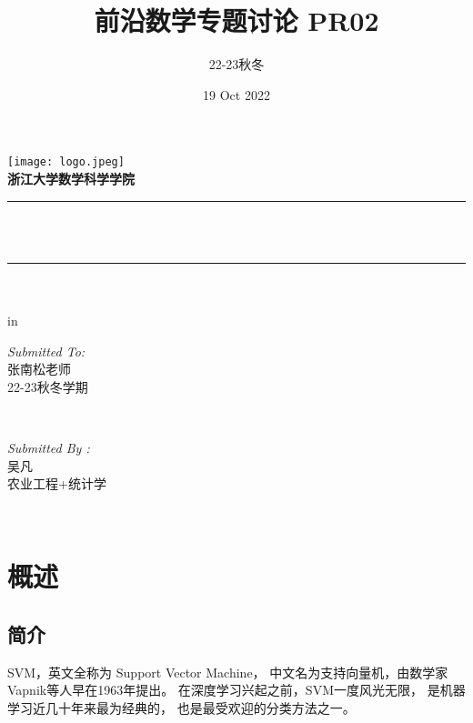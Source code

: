 \documentclass[12pt]{article}
\title{ 前沿数学专题讨论 PR02}								%
\author{22-23秋冬}								%
\date{19 Oct 2022}	%
\makeatletter
\let\thetitle\@title
\let\thedate\@date
\makeatother
\begin{document}

\begin{titlepage}
	\centering
    \vspace*{0.5 cm}
    \texttt{[image: logo.jpeg]}\\[1.0 cm]	%
	\textsc{\Large \textbf{浙江大学数学科学学院} }\\[0.5 cm]				%
	\rule{\linewidth}{0.2 mm} \\[0.4 cm]
	{ \huge \bfseries \thetitle}\\
	\rule{\linewidth}{0.2 mm} \\[1.5 cm]
	{  \bfseries \thedate}\\
	 in
	\begin{minipage}{0.4\textwidth}
		\begin{flushleft} \large
			\emph{Submitted To:}\\
			张南松老师\\
                22-23秋冬学期\\
			\end{flushleft}
			\end{minipage}~
			\begin{minipage}{0.4\textwidth}
            
			\begin{flushright} \large
			\emph{Submitted By :} \\
			吴凡\\
            农业工程+统计学\\
		\end{flushright}
        
	\end{minipage}\\[2 cm]		    
	
\end{titlepage}

\tableofcontents
\pagebreak


\section{概述}
\subsection{简介}
SVM，英文全称为 Support Vector Machine，
中文名为支持向量机，由数学家Vapnik等人早在1963年提出。
在深度学习兴起之前，SVM一度风光无限，
是机器学习近几十年来最为经典的，
也是最受欢迎的分类方法之一。
\end{document}
